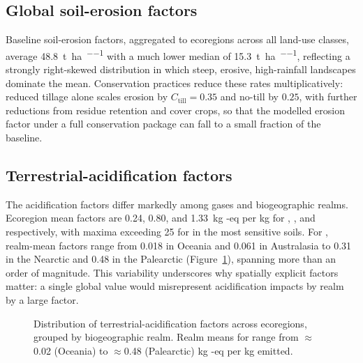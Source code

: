 \documentclass[11pt]{article}
\begin{document}
\subsection{Global soil-erosion factors}
Baseline soil-erosion factors, aggregated to ecoregions across all land-use classes,
average \SI{48.8}{\tonne\per\hectare\per\year} with a much lower median of
\SI{15.3}{\tonne\per\hectare\per\year}, reflecting a strongly right-skewed distribution
in which steep, erosive, high-rainfall landscapes dominate the mean. Conservation
practices reduce these rates multiplicatively: reduced tillage alone scales erosion by
$C_{\text{till}}=0.35$ and no-till by $0.25$, with further reductions from residue
retention and cover crops, so that the modelled erosion factor under a full conservation
package can fall to a small fraction of the baseline.

\subsection{Terrestrial-acidification factors}
The acidification factors differ markedly among gases and biogeographic realms. Ecoregion
mean factors are \SI{0.24}{}, \SI{0.80}{}, and \SI{1.33}{\kilogram} -eq per
\si{\kilogram} for , , and  respectively, with maxima exceeding
\SI{25}{} for  in the most sensitive soils. For , realm-mean factors
range from \SI{0.018}{} in Oceania and \SI{0.061}{} in Australasia to \SI{0.31}{} in the
Nearctic and \SI{0.48}{} in the Palearctic (Figure~\ref{fig:acid}), spanning more than an
order of magnitude. This variability underscores why spatially explicit factors matter:
a single global value would misrepresent acidification impacts by realm by a large
factor.

\begin{figure}[t]
\centering
\caption{Distribution of terrestrial-acidification factors across ecoregions, grouped by
biogeographic realm. Realm means for  range from \(\approx\)0.02 (Oceania) to
\(\approx\)0.48 (Palearctic) \si{\kilogram} -eq per \si{\kilogram} emitted.}
\label{fig:acid}
\end{figure}
\end{document}
